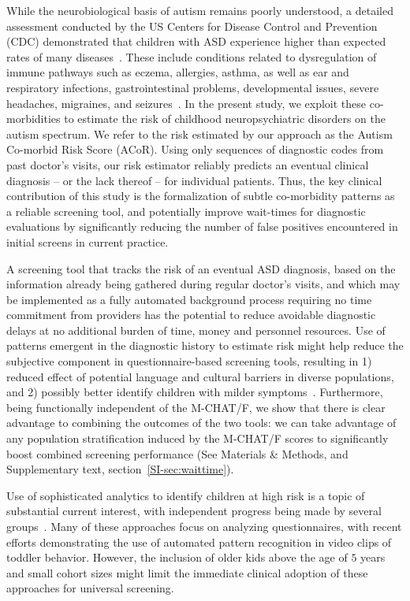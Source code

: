 \documentclass[onecolumn,,10pt]{IEEEtran}
\def\acor{ACoR\xspace}
\begin{document}
While the neurobiological basis of autism remains poorly understood,  a detailed assessment conducted by the US Centers for Disease Control and Prevention (CDC) demonstrated that  children with ASD experience  higher than expected rates of many diseases~\cite{cdc}. These include conditions related to dysregulation of immune pathways such as eczema, allergies, asthma, as well as ear and respiratory infections, gastrointestinal problems, developmental issues, severe headaches, migraines, and seizures~\cite{pmid30733689,pmid22511918}. In the present study, we exploit   these   co-morbidities to estimate the risk of  childhood neuropsychiatric disorders on the autism spectrum. We refer to the risk estimated by our approach as the Autism Co-morbid Risk Score (\acor). Using only sequences of diagnostic codes from past doctor's visits, our risk estimator reliably
predicts an eventual clinical  diagnosis -- or the lack thereof -- for individual patients.
Thus, the key clinical  contribution of this study is the formalization  of subtle co-morbidity patterns as a reliable screening tool, and potentially  improve wait-times for diagnostic evaluations by significantly reducing the number of false positives encountered in initial screens in current practice.

 
A  screening  tool that tracks the risk of an eventual ASD diagnosis,  based  on the information already being gathered during regular doctor's visits, and which may be implemented as a  fully automated background process requiring no time commitment from providers has the potential to reduce avoidable diagnostic  delays at no additional burden of time, money and personnel resources.  Use of patterns emergent in  the diagnostic history to estimate risk might help reduce the subjective component in questionnaire-based screening tools, resulting in 1) reduced effect of potential language and cultural barriers in diverse populations, and 2) possibly better identify children with milder symptoms~\cite{hyman2020identification}.
Furthermore, being functionally independent of the M-CHAT/F, we show that there is clear advantage to combining the outcomes of the two tools: we can take advantage of any population stratification induced by the M-CHAT/F scores to significantly boost combined screening performance (See Materials \&  Methods, and Supplementary text, section~\ref{SI-sec:waittime}).
 


Use of sophisticated analytics to identify children at high risk is a topic of substantial current interest, with independent progress being made by several groups~\cite{hyde2019applications,abbas2020multi,duda2016clinical,duda2014testing,fusaro2014potential,wall2012use,wall2012use2}. Many of these approaches  focus on analyzing questionnaires, with recent efforts demonstrating the use of  automated pattern recognition in video clips of toddler behavior. However, the inclusion of older kids above the age of  $5$ years and  small cohort sizes might limit the immediate clinical adoption of these approaches for universal screening.
\end{document}

